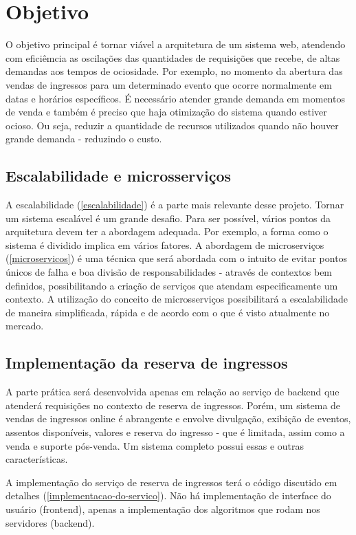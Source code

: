 \chapter{Objetivo}

O objetivo principal é tornar viável a arquitetura de um sistema web, atendendo com eficiêmcia 
as oscilações das quantidades de requisições que recebe, de altas demandas aos tempos de ociosidade.
Por exemplo, no momento da abertura das vendas de ingressos para um determinado evento
que ocorre normalmente em datas e horários específicos. É necessário atender grande demanda
em momentos de venda e também é preciso que haja otimização do sistema quando estiver ocioso.
Ou seja, reduzir a quantidade de recursos utilizados quando não houver
grande demanda - reduzindo o custo.

\section{Escalabilidade e microsserviços}
A escalabilidade (\autoref{escalabilidade}) é a parte mais relevante desse projeto.
Tornar um sistema escalável é um grande desafio.
Para ser possível, vários pontos da arquitetura devem ter a
abordagem adequada. Por exemplo, a forma como o sistema é dividido implica em vários
fatores.
A abordagem de microserviços (\autoref{microservicos}) é uma técnica que será abordada
com o intuito de evitar pontos únicos de falha e boa divisão de responsabilidades
- através de contextos bem definidos, possibilitando a criação de serviços que
atendam especificamente um contexto.
A utilização do conceito de microsserviços possibilitará a escalabilidade de maneira
simplificada, rápida e de acordo com o que é visto atualmente no mercado.

\section{Implementação da reserva de ingressos}

A parte prática será desenvolvida apenas em relação ao serviço de backend que
atenderá requisições no contexto de reserva de ingressos.
Porém, um sistema de vendas de ingressos online é abrangente e envolve divulgação,
exibição de eventos, assentos disponíveis, valores e reserva do ingresso -
que é limitada, assim como a venda e suporte pós-venda. Um sistema completo possui essas
e outras características.

A implementação do serviço de reserva de ingressos terá o código discutido
em detalhes (\autoref{implementacao-do-servico}). Não há implementação
de interface do usuário (frontend), apenas a implementação dos algoritmos
que rodam nos servidores (backend).

